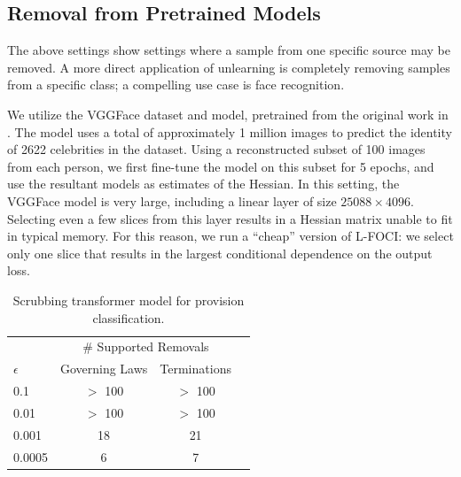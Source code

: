\subsection{Removal from Pretrained Models}
The above settings show settings where a sample from one specific source may be removed. A more direct application of unlearning 
is completely removing samples from a specific class; a compelling use case is face recognition.

We utilize the VGGFace dataset and model, pretrained from the original work in \cite{huang2008labeled,Parkhi15}. The model uses a total of approximately 1 million images to predict the identity of 2622 celebrities in the dataset. Using a reconstructed subset of 100 images from each person, we first fine-tune the model on this subset for 5 epochs, and use the resultant models as estimates of the Hessian. 
In this setting, the VGGFace model is very large, including a linear layer of size $25088 \times 4096$. Selecting even a few slices from this layer results in a Hessian matrix unable to fit in typical memory. For this reason, we run a ``cheap'' version of L-FOCI: we select only one slice that results in the largest conditional dependence on the output loss.
%

\begin{table}
    \centering
    \begin{tabular}[b]{l|ccc}
        \hline\hline
        & \multicolumn{2}{c}{\# Supported Removals}  \\
        $\epsilon$ & Governing Laws & Terminations \\
        \hline
        0.1 & $>$ 100 & $>$ 100 \\
        0.01 & $>$ 100 & $>$ 100 \\
        0.001 & 18 & 21 \\
        0.0005 & 6 & 7 \\
        \hline\hline
    \end{tabular}%
	\caption[Removal performance in pretrained transformer models]{\label{tab:nlp} Scrubbing transformer model for provision classification.}
\end{table}

